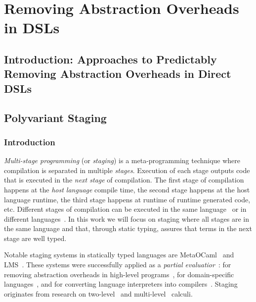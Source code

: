 \part{Removing Abstraction Overheads in DSLs}

\chapter{Introduction: Approaches to Predictably Removing Abstraction Overheads in Direct DSLs}
\label{sec:introdution-partial-evaluation}

\chapter{Polyvariant Staging }
\label{sec:polyvariant-staging}
 \section{Introduction}

 \emph{Multi-stage programming} (or \emph{staging}) is a meta-programming technique
  where compilation is separated in multiple \emph{stages}. Execution of each
  stage outputs code that is executed in the \emph{next stage} of compilation. The first
  stage of compilation happens at the \emph{host language} compile time, the second
  stage happens at the host language runtime, the third stage happens at runtime of
  runtime generated code, etc. Different stages of compilation can be executed in the same
  language~\cite{taha_multi-stage_1997,nielson2005two} or in different languages~\cite{brown_heterogeneous_2011,devito2013terra}.
  In this work we will focus on staging where all stages are in the same language and that, through static typing, assures that terms in the next stage are well typed.

  Notable staging systems in statically typed languages are
  MetaOCaml~\cite{taha_multi-stage_1997,calcagno2003implementing}
  and LMS~\cite{rompf2012lightweight}. These systems were successfully applied as a
  \emph{partial evaluatior}~\cite{jones1993partial}: for removing abstraction
  overheads in high-level programs~\cite{carette2005multi,rompf2012lightweight},
  for domain-specific languages~\cite{czarnecki_dsl_2004,jonnalagedda2014staged,taha2004gentle}, and for converting language
  interpreters into compilers~\cite{lancet,futamura1999partial}. Staging originates
  from research on two-level~\cite{nielson2005two,davies1996temporal} and multi-level~\cite{davies1996modal} calculi.

